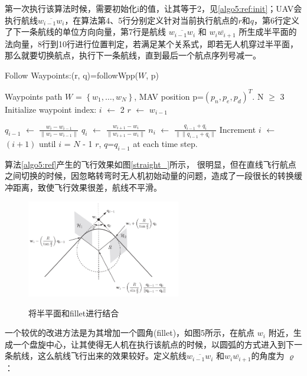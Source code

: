 \documentclass[UTF8,a4paper,10pt,nocolorlinks]{ctexart}
\begin{document}
    第一次执行该算法时候，需要初始化i的值，让其等于2，见\ref{algo5:ref:init}；UAV会执行航线$\overline{w_{i-1}w_{i}}$，在算法第4、5行分别定义针对当前执行航点的$r$和$q$，第6行定义了下一条航线的单位方向向量，第7行是航线 $\overline{w_{i-1}w_{i}}$ 和 $\overline{w_{i}w_{i+1}}$ 所生成半平面的法向量，8行到10行进行位置判定，若满足某个关系式，即若无人机穿过半平面，
    那么就要切换航点，执行下一条航线，直到最后一个航点序列号减一。
\begin{algorithm}[h]
            \caption{Follow Waypoints:(r, q)=followWpp($\textit{W}$, p)}
            \label{algo5:ref}
            \begin{algorithmic}[1]
                \ENSURE Waypoints path $\textit{W}$ = $\left\{ w_{1}, \dots, w_{N} \right\}$, MAV position p=$(p_{n}, p_{e}, p_{d})^{T}$.
                \REQUIRE N $\geq$ 3
                    \STATE Initialize waypoint index: $i$ $\gets$ 2
                    \label{algo5:ref:init}
                \ENDIF
                \STATE $r$ $\gets$ $w_{i-1}$

                \STATE $q_{i-1}$ $\gets$ $\frac{w_{i}-w_{i-1}}{\lVert w_{i}-w_{i-1} \rVert}$
                \STATE $q_{i}$ $\gets$ $\frac{w_{i+1}-w_{i}}{\lVert w_{i+1}-w_{i} \rVert}$
                \STATE $n_{i}$ $\gets$ $\frac{q_{i-1}+q_{i}}{\lVert \| q_{i-1}+q_{i} \rVert}$
                    \STATE Increment $i$ $\gets$ $\left(i+1\right)$ until $i$ = $N$ - 1
                \ENDIF
                \RETURN $r$, $q$=$q_{i-1}$ at each time step.  %
            \end{algorithmic}
        \end{algorithm}

        \par 算法\ref{algo5:ref}产生的飞行效果如图\ref{straight_}所示，
        很明显，但在直线飞行航点之间切换的时候，因忽略转弯时无人机初始动量的问题，造成了一段很长的转换缓冲距离，致使飞行效果很差，航线不平滑。
    \begin{figure}[h]
        \centering
        \includegraphics[width=0.6\textwidth]{picture/algo6_3.png}
        \label{algo6_1}
        \caption{将半平面和fillet进行结合}
    \end{figure}
    \par 一个较优的改进方法是为其增加一个圆角(fillet)，如图5所示，在航点 $w_{i}$ 附近，生成一个盘旋中心，让其使得无人机在执行该航点的时候，以圆弧的方式进入到下一条航线，这么航线飞行出来的效果较好。定义航线$\overline{w_{i-1}w_{i}}$ 和$\overline{w_{i}w_{i+1}}$的角度为 $\varrho$：
    
\end{document}
